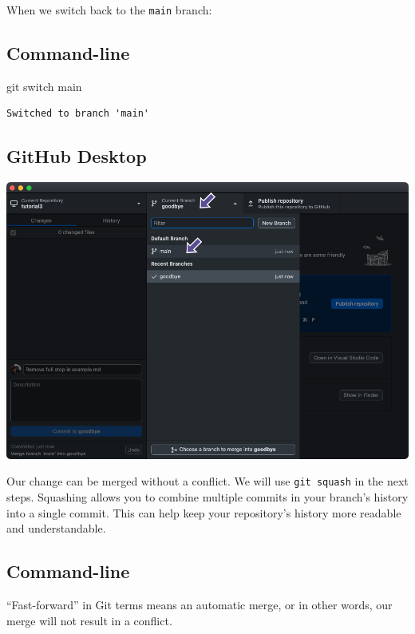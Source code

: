 \documentclass[
  letterpaper,
  DIV=11,
  numbers=noendperiod]{scrartcl}
\newenvironment{Shaded}{\begin{snugshade}}{\end{snugshade}}
\newcommand{\FunctionTok}[1]{\textcolor[rgb]{0.28,0.35,0.67}{#1}}
\newcommand{\NormalTok}[1]{\textcolor[rgb]{0.00,0.23,0.31}{#1}}
\begin{document}
When we switch back to the \texttt{main} branch:

\subsection{Command-line}

\begin{Shaded}
\begin{Highlighting}[]
\FunctionTok{git}\NormalTok{ switch main}
\end{Highlighting}
\end{Shaded}

\begin{verbatim}
Switched to branch 'main'
\end{verbatim}

\subsection{GitHub Desktop}

\includegraphics{images/image69.png}

Our change can be merged without a conflict. We will use
\texttt{git\ squash} in the next steps. Squashing allows you to combine
multiple commits in your branch's history into a single commit. This can
help keep your repository's history more readable and understandable.

\subsection{Command-line}

``Fast-forward'' in Git terms means an automatic merge, or in other
words, our merge will not result in a conflict.
\end{document}
